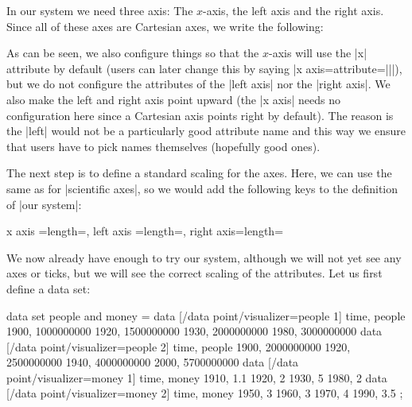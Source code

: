 In our system we need three axis: The $x$-axis, the left axis and the
right axis. Since all of these axes are Cartesian axes, we write the
following:
\begin{codeexample}
\end{codeexample}
As can be seen, we also configure things so that the $x$-axis will use
the |x| attribute by default (users can later change this by saying
|x axis={attribute=||}|), but we do not
configure the attributes of the |left axis| nor the |right axis|. We
also make the left and right axis point upward (the |x axis| needs no
configuration here since a Cartesian axis points right by default). The
reason is the |left| would not be a particularly good attribute name
and this way we ensure that users have to pick names themselves
(hopefully good ones).

The next step is to define a standard scaling for the axes. Here, we
can use the same as for |scientific axes|, so we would add the
following keys to the definition of |our system|:
\begin{codeexample}
x axis    ={length=},
left axis ={length=},
right axis={length=}
\end{codeexample}

We now already have enough to try our system, although we will not yet
see any axes or ticks, but we will see the correct scaling of the
attributes. Let us first define a data set:
\begin{codeexample}[]
\tikz \datavisualization data set {people and money} = {
    data [/data point/visualizer=people 1] {
      time, people
      1900, 1000000000
      1920, 1500000000
      1930, 2000000000
      1980, 3000000000
    }
    data [/data point/visualizer=people 2] {
      time, people
      1900, 2000000000
      1920, 2500000000
      1940, 4000000000
      2000, 5700000000
    }
    data [/data point/visualizer=money 1] {
      time, money
      1910, 1.1
      1920, 2
      1930, 5
      1980, 2
    }
    data [/data point/visualizer=money 2] {
      time, money
      1950, 3
      1960, 3
      1970, 4
      1990, 3.5
    } 
  };
\end{codeexample}

